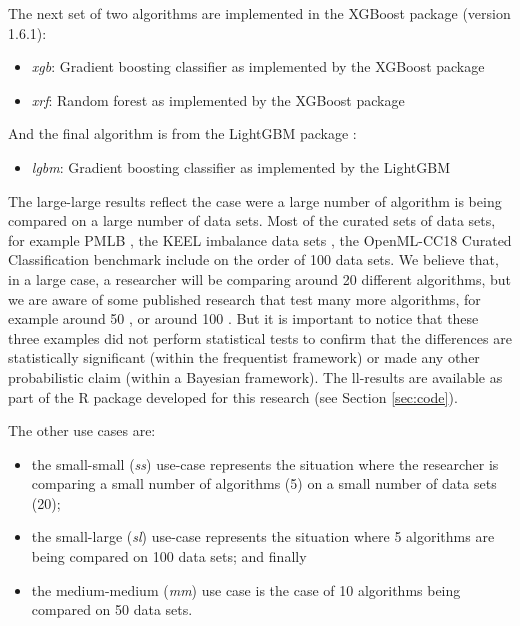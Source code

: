 \documentclass[twoside,11pt,preprint]{article}
\def\tightlist{}
\begin{document}
The next set of two algorithms are implemented in the XGBoost package \citep{Chen:2016:XST:2939672.2939785} (version 1.6.1):

\begin{itemize}
\tightlist
\item
  \emph{xgb}: Gradient boosting classifier as implemented by the XGBoost package
\item
  \emph{xrf}: Random forest as implemented by the XGBoost package
\end{itemize}

And the final algorithm is from the LightGBM package \citep{ke2017lightgbm} :

\begin{itemize}
\tightlist
\item
  \emph{lgbm}: Gradient boosting classifier as implemented by the LightGBM
\end{itemize}

The large-large results reflect the case were a large number of
algorithm is being compared on a large number of data sets. Most of
the curated sets of data sets, for example PMLB \citep{Olson2017PMLB}, the
KEEL imbalance data sets \citep{alcala2011keel}, the OpenML-CC18 Curated
Classification benchmark \citep{oml-benchmarking-suites} include on the
order of 100 data sets. We believe that, in a large case, a
researcher will be comparing around 20 different algorithms, but we
are aware of some published research that test many more algorithms,
for example around 50 \citep{wainer2021tune}, or around 100
\citep{fernandez2014we, wang2021comparing}. But it is important to notice
that these three examples did not perform statistical tests to confirm
that the differences are statistically significant (within the
frequentist framework) or made any other probabilistic claim (within a
Bayesian framework). The ll-results are available as part of the R
package developed for this research (see Section \ref{sec:code}).

The other use cases are:

\begin{itemize}
\tightlist
\item
  the small-small (\emph{ss}) use-case represents the situation where the
  researcher is comparing a small number of algorithms (5) on a small
  number of data sets (20);
\item
  the small-large (\emph{sl}) use-case represents the situation where 5
  algorithms are being compared on 100 data sets; and finally
\item
  the medium-medium (\emph{mm}) use case is the case of 10 algorithms being compared on 50 data sets.
\end{itemize}
\end{document}
